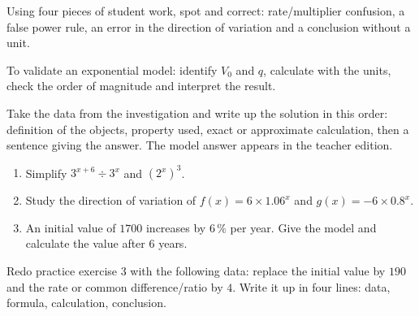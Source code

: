 \begin{activite}
Using four pieces of student work, spot and correct: rate/multiplier confusion, a false power rule, an error in the direction of variation and a conclusion without a unit.

\end{activite}

\begin{traceecrite}To validate an exponential model: identify $V_0$ and $q$, calculate with the units, check the order of magnitude and interpret the result.\end{traceecrite}

\begin{exemple}
Take the data from the investigation and write up the solution in this order: definition of the objects, property used, exact or approximate calculation, then a sentence giving the answer. The model answer appears in the teacher edition.
\end{exemple}

\begin{exercice}[-- essential]
\begin{enumerate}\item Simplify $3^{x+6}\div3^x$ and $(2^x)^3$.\item Study the direction of variation of $f(x)=6\times1.06^x$ and $g(x)=-6\times0.8^x$.\item An initial value of $1700$ increases by $6\,\%$ per year. Give the model and calculate the value after $6$ years.\end{enumerate}
\end{exercice}


\begin{dm}Redo practice exercise 3 with the following data: replace the initial value by $190$ and the rate or common difference/ratio by $4$. Write it up in four lines: data, formula, calculation, conclusion.\end{dm}

